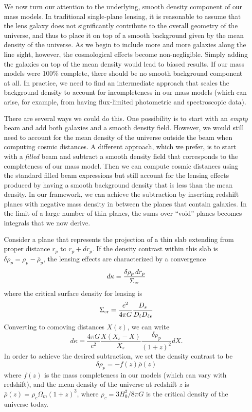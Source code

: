 \documentclass{emulateapj}
\newcommand\drho{\delta\rho}
\newcommand\Sigcrit{\Sigma_{\rm{cr}}}
\begin{document}
We now turn our attention to the underlying, smooth density component of our mass models. In traditional single-plane lensing, it is reasonable to assume that the lens galaxy does not significantly contribute to the overall geometry of the universe, and thus to place it on top of a smooth background given by the mean density of the universe.  As we begin to include more and more galaxies along the line sight, however, the cosmological effects become non-negligible.  Simply adding the galaxies on top of the mean density would lead to biased results.  If our mass models were 100\% complete, there should be no smooth background component at all.  In practice, we need to find an intermediate approach that scales the background density to account for incompleteness in our mass models (which can arise, for example, from having flux-limited photometric and spectroscopic data).

There are several ways we could do this.  One possibility is to start with an \emph{empty} beam and add both galaxies and a smooth density field.  However, we would still need to account for the mean density of the universe outside the beam when computing cosmic distances.  A different approach, which we prefer, is to start with a \emph{filled} beam and subtract a smooth density field that corresponds to the completeness of our mass model.  Then we can compute cosmic distances using the standard filled beam expressions but still account for the lensing effects produced by having a smooth background density that is less than the mean density.  In our framework, we can achieve the subtraction by inserting redshift planes with negative mass density in between the planes that contain galaxies.  In the limit of a large number of thin planes, the sums over ``void'' planes becomes integrals that we now derive.

Consider a plane that represents the projection of a thin slab extending from proper distance $r_p$ to $r_p+dr_p$.  If the density contrast within this slab is $\drho_p = \rho_p - \bar\rho_p$, the lensing effects are characterized by a convergence
\begin{equation}
  d\kappa = \frac{\drho_p\,dr_p}{\Sigcrit}
\end{equation}
where the critical surface density for lensing is
\begin{equation}
  \Sigcrit = \frac{c^2}{4 \pi G} \frac{D_s}{D_\ell D_{\ell s}}
\end{equation}
Converting to comoving distances $X(z)$, we can write
\begin{equation}\label{eqn:dkappa}
  d\kappa = \frac{4 \pi G}{c^2}\frac{X (X_s - X)}{X_s} \frac{\drho_p}{(1+z)^2} dX.
\end{equation}
In order to achieve the desired subtraction, we set the density contrast to be
\begin{equation}
  \drho_p = -f(z) \bar{\rho}(z) 
\end{equation}
where $f(z)$ is the mass completeness in our models (which can vary with redshift), and the mean density of the universe at redshift $z$ is $\bar{\rho}(z) = \rho_{c} \Omega_m (1 + z)^3$, where $\rho_{c} = 3 H_0^2 / 8 \pi G$ is the critical density of the universe today.
\end{document}
